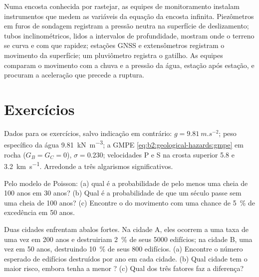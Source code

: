 \begin{inthefield}
Numa encosta conhecida por rastejar, as equipes de monitoramento instalam instrumentos que medem as variáveis da
equação da encosta infinita. Piezômetros em furos de sondagem registram a pressão neutra na superfície de deslizamento;
tubos inclinométricos, lidos a intervalos de profundidade, mostram onde o terreno se curva e com que rapidez; estações
GNSS e extensômetros registram o movimento da superfície; um pluviômetro registra o gatilho.
As equipes comparam o movimento com a chuva e a pressão da água, estação após estação, e procuram
a aceleração que precede a ruptura.
\end{inthefield}

\section*{Exercícios}\label{sec:b2:geological-hazards:exercises}

Dados para os exercícios, salvo indicação em contrário: $g = \qty{9.81}{m.s^{-2}}$; peso específico da água
\qty{9.81}{kN.m^{-3}}; a GMPE \eqref{eq:b2:geological-hazards:gmpe} em rocha ($G_B = G_C = 0$),
$\sigma = 0.230$; velocidades P e S na crosta superior 5.8 e \qty{3.2}{km.s^{-1}}. Arredonde a três
algarismos significativos.

\begin{exercise}[$\star$]\label{exo:b2:geological-hazards:1}
Pelo modelo de Poisson: (a) qual é a probabilidade de pelo menos uma cheia de 100 anos em 30 anos?
(b) Qual é a probabilidade de que um século passe sem uma cheia de 100 anos? (c) Encontre o  do movimento com uma chance de \qty{5}{\percent} de excedência em 50 anos.
\end{exercise}

\begin{exercise}[$\star$]\label{exo:b2:geological-hazards:2}
Duas cidades enfrentam abalos fortes. Na cidade A, eles ocorrem a uma taxa de uma vez em 200 anos e
destruiriam \qty{2}{\percent} de seus 5000 edifícios; na cidade B, uma vez em 50 anos, destruindo
\qty{10}{\percent} de seus 800 edifícios. (a) Encontre o número esperado de edifícios destruídos por
ano em cada cidade. (b) Qual cidade tem o maior risco, embora tenha a menor ? (c)
Qual dos três fatores faz a diferença?
\end{exercise}

